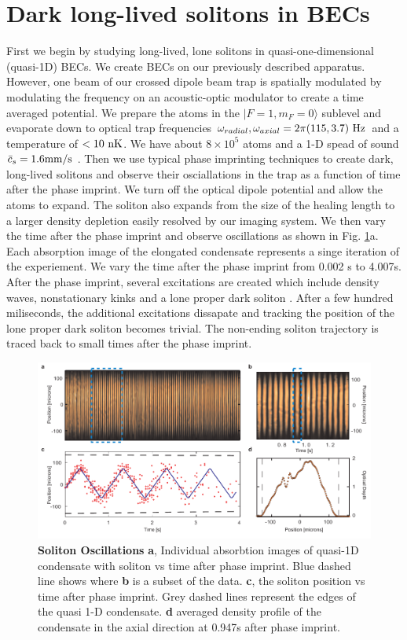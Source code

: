 \documentclass{nature}
\newcommand{\ket}[1]{|#1\rangle}
\def\Hz{{\ {\rm Hz}}}						%
\def\nK{{\ {\rm nK}}}						%
\begin{document}
\section{Dark long-lived solitons in BECs}
First we begin by studying long-lived, lone solitons in quasi-one-dimensional (quasi-1D) BECs. We create BECs on our previously described apparatus\cite{Lin2009e}. However, one beam of our crossed dipole beam trap is spatially modulated by modulating the frequency on an acoustic-optic modulator to create a time averaged potential. We prepare the atoms in the $\ket{F=1,m_{F}=0}$ sublevel and evaporate down to optical trap frequencies $\omega_{radial},\omega_{axial} = 2 \pi (115, 3.7)\Hz$ and a temperature of $<10\nK$. We have about $8 \times 10^{5}$ atoms and a 1-D spead of sound $\bar{c}_{s}=1.6 \rm{mm/s}$ \cite{Zaremba1998,Stringari1998,Kavoulakis1998,Andrews1997b}. Then we use typical phase imprinting techniques\cite{Burger1999,Denschlag2000} to create dark, long-lived solitons and observe their osciallations in the trap as a function of time after the phase imprint. We turn off the optical dipole potential and allow the atoms to expand. The soliton also expands from the size of the healing length to a larger density depletion easily resolved by our imaging system. We then vary the time after the phase imprint and observe oscillations as shown in Fig. \ref{solOsc}a. Each absorption image of the elongated condensate represents a singe iteration of the experiement. We vary the time after the phase imprint from 0.002 s to 4.007s. After the phase imprint, several excitations are created which include density waves, nonstationary kinks and a lone proper dark soliton \cite{Muryshev2002}. After a few hundred miliseconds, the additional excitations dissapate and tracking the position of the lone proper dark soliton becomes trivial. The non-ending soliton trajectory is traced back to small times after the phase imprint. 
\begin{figure}[h!]
   \includegraphics[width=136mm]{Figures/Fig1_solOscV3.pdf}
   \caption{\textbf{Soliton Oscillations} \textbf{a}, Individual absorbtion images of quasi-1D condensate with soliton vs time after phase imprint. Blue dashed line shows where \textbf{b} is a subset of the data. \textbf{c}, the soliton position vs time after phase imprint. Grey dashed lines represent the edges of the quasi 1-D condensate. \textbf{d} averaged density profile of the condensate in the axial direction at 0.947s after phase imprint.}
   \label{solOsc}
\end{figure}
\end{document}
